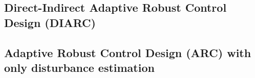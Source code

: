 \subsection{Direct-Indirect Adaptive Robust Control Design (DIARC)}
\subsection{Adaptive Robust Control Design (ARC) with only disturbance estimation}
